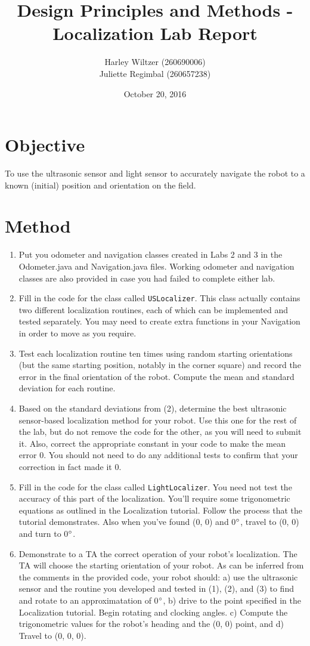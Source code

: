 \documentclass[11pt]{article}
\title{Design Principles and Methods - Localization Lab Report}
\author{Harley Wiltzer (260690006)\\Juliette Regimbal (260657238)}
\date{October 20, 2016}
\begin{document}
\maketitle
{}

\section{Objective}
To use the ultrasonic sensor and light sensor to accurately navigate the robot to a known (initial) position and orientation on the field.
\section{Method}
\begin{enumerate}
\item Put you odometer and navigation classes created in Labs 2 and 3 in the Odometer.java and Navigation.java files. Working odometer and navigation classes are also provided in case you had failed to complete either lab.
\item Fill in the code for the class called \texttt{USLocalizer}. This class actually contains two different localization routines, each of which can be implemented and tested separately. You may need to create extra functions in your Navigation in order to move as you require.
\item Test each localization routine ten times using random starting orientations (but the same starting position, notably in the corner square) and record the error in the final orientation of the robot. Compute the mean and standard deviation for each routine.
\item Based on the standard deviations from (2), determine the best ultrasonic sensor-based localization method for your robot. Use this one for the rest of the lab, but do not remove the code for the other, as you will need to submit it. Also, correct the appropriate constant in your code to make the mean error 0. You should not need to do any additional tests to confirm that your correction in fact made it 0.
\item Fill in the code for the class called \texttt{LightLocalizer}. You need not test the accuracy of this part of the localization. You'll require some trigonometric equations as outlined in the Localization tutorial. Follow the process that the tutorial demonstrates. Also when you've found (0, 0) and 0$\degree$, travel to (0, 0) and turn to 0$\degree$.
\item Demonstrate to a TA the correct operation of your robot's localization. The TA will choose the starting orientation of your robot. As can be inferred from the comments in the provided code, your robot should: a) use the ultrasonic sensor and the routine you developed and tested in (1), (2), and (3) to find and rotate to an approximatation of 0$\degree$, b) drive to the point specified in the Localization tutorial. Begin rotating and clocking angles. c) Compute the trigonometric values for the robot's heading and the (0, 0) point, and d) Travel to (0, 0, 0).
\end{enumerate}
\newpage
\end{document}
